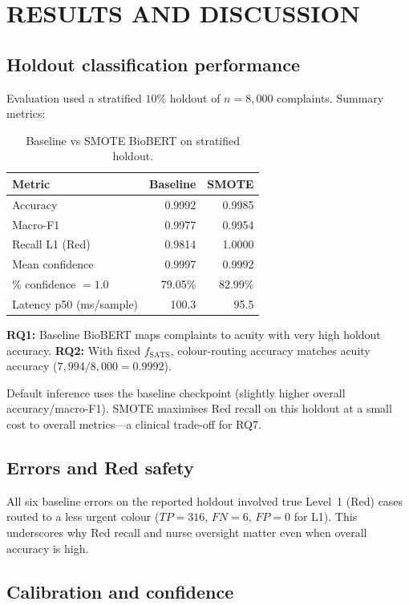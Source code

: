 \chapter{RESULTS AND DISCUSSION}
\label{ch:results}

\section{Holdout classification performance}

Evaluation used a stratified \(10\%\) holdout of \(n=8{,}000\) complaints. Summary metrics:

\begin{table}[h]
\centering
\caption{Baseline vs SMOTE BioBERT on stratified holdout.}
\label{tab:metrics}
\begin{tabular}{lrr}
\hline
Metric & Baseline & SMOTE \\
\hline
Accuracy & 0.9992 & 0.9985 \\
Macro-F1 & 0.9977 & 0.9954 \\
Recall L1 (Red) & 0.9814 & 1.0000 \\
Mean confidence & 0.9997 & 0.9992 \\
\% confidence \(=1.0\) & 79.05\% & 82.99\% \\
Latency p50 (ms/sample) & 100.3 & 95.5 \\
\hline
\end{tabular}
\end{table}

\textbf{RQ1:} Baseline BioBERT maps complaints to acuity with very high holdout accuracy. \textbf{RQ2:} With fixed \(f_{\mathrm{SATS}}\), colour-routing accuracy matches acuity accuracy (\(7{,}994/8{,}000=0.9992\)).

Default inference uses the baseline checkpoint (slightly higher overall accuracy/macro-F1). SMOTE maximises Red recall on this holdout at a small cost to overall metrics---a clinical trade-off for RQ7.

\section{Errors and Red safety}

All six baseline errors on the reported holdout involved true Level~1 (Red) cases routed to a less urgent colour (\(TP=316\), \(FN=6\), \(FP=0\) for L1). This underscores why Red recall and nurse oversight matter even when overall accuracy is high.

\section{Calibration and confidence}

